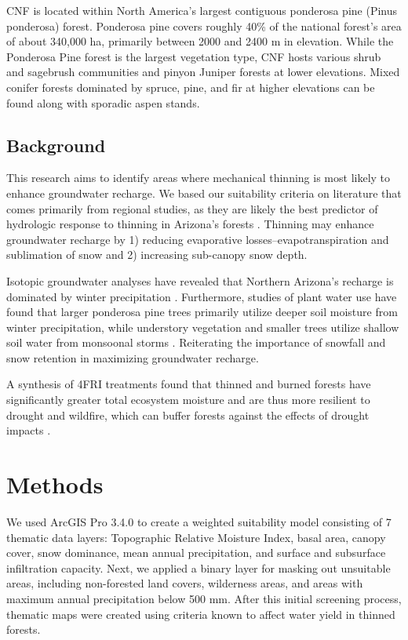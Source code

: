 \documentclass[
  number,
  preprint,
  3p,
  onecolumn]{elsarticle}
\begin{document}
CNF is located within North America's largest contiguous ponderosa pine
(Pinus ponderosa) forest. Ponderosa pine covers roughly 40\% of the
national forest's area of about 340,000 ha, primarily between 2000 and
2400 m in elevation. While the Ponderosa Pine forest is the largest
vegetation type, CNF hosts various shrub and sagebrush communities and
pinyon Juniper forests at lower elevations. Mixed conifer forests
dominated by spruce, pine, and fir at higher elevations can be found
along with sporadic aspen stands.

\subsection{Background}\label{background}

This research aims to identify areas where mechanical thinning is most
likely to enhance groundwater recharge. We based our suitability
criteria on literature that comes primarily from regional studies, as
they are likely the best predictor of hydrologic response to thinning in
Arizona's forests \citep{wyatt_estimating_2013}. Thinning may enhance
groundwater recharge by 1) reducing evaporative
losses--evapotranspiration and sublimation of snow and 2) increasing
sub-canopy snow depth.

Isotopic groundwater analyses have revealed that Northern Arizona's
recharge is dominated by winter precipitation
\citep{eastoe2007, eastoe2023, earman2006}. Furthermore, studies of
plant water use have found that larger ponderosa pine trees primarily
utilize deeper soil moisture from winter precipitation, while understory
vegetation and smaller trees utilize shallow soil water from monsoonal
storms \citep{kerhoulas2013, kerhoulas2023}. Reiterating the importance
of snowfall and snow retention in maximizing groundwater recharge.

A synthesis of 4FRI treatments found that thinned and burned forests
have significantly greater total ecosystem moisture and are thus more
resilient to drought and wildfire, which can buffer forests against the
effects of drought impacts
\citep{sankey_thinning_2022, sankey_regionalscale_2021}.

\section{Methods}\label{methods}

We used ArcGIS Pro 3.4.0 to create a weighted suitability model
consisting of 7 thematic data layers: Topographic Relative Moisture
Index, basal area, canopy cover, snow dominance, mean annual
precipitation, and surface and subsurface infiltration capacity. Next,
we applied a binary layer for masking out unsuitable areas, including
non-forested land covers, wilderness areas, and areas with maximum
annual precipitation below 500 mm. After this initial screening process,
thematic maps were created using criteria known to affect water yield in
thinned forests.
\end{document}
